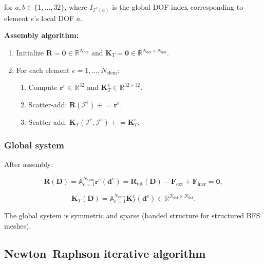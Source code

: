 \documentclass[11pt]{article}
\begin{document}
for $a,b\in\{1,\ldots,32\}$, where $I_{\mathcal{I}^{e}(a)}$ is the
global DOF index corresponding to element $e$'s local DOF $a$.

\textbf{Assembly algorithm:}
\begin{enumerate}
\item Initialize $\mathbf{R}=\mathbf{0}\in\mathbb{R}^{N_{\mathrm{dof}}}$
  and $\mathbf{K}_{T}=\mathbf{0}\in\mathbb{R}^{N_{\mathrm{dof}}\times N_{\mathrm{dof}}}$.
\item For each element $e=1,\ldots,N_{\mathrm{elem}}$:
  \begin{enumerate}
  \item Compute $\mathbf{r}^{e}\in\mathbb{R}^{32}$ and
    $\mathbf{K}_{T}^{e}\in\mathbb{R}^{32\times 32}$.
  \item Scatter-add: $\mathbf{R}(\mathcal{I}^{e}) \mathrel{+}= \mathbf{r}^{e}$.
  \item Scatter-add: $\mathbf{K}_{T}(\mathcal{I}^{e},\mathcal{I}^{e})
    \mathrel{+}= \mathbf{K}_{T}^{e}$.
  \end{enumerate}
\end{enumerate}

\subsubsection{Global system}

After assembly:

\begin{equation}
\boxed{
\mathbf{R}(\mathbf{D})
= \mathbb{A}_{e=1}^{N_{\mathrm{elem}}}
  \mathbf{r}^{e}(\mathbf{d}^{e})
= \mathbf{R}_{\mathrm{int}}(\mathbf{D})
- \mathbf{F}_{\mathrm{ext}}
+ \mathbf{F}_{\mathrm{iner}}
= \mathbf{0},
}
\label{s7:global_residual}
\end{equation}

\begin{equation}
\boxed{
\mathbf{K}_{T}(\mathbf{D})
= \mathbb{A}_{e=1}^{N_{\mathrm{elem}}}
  \mathbf{K}_{T}^{e}(\mathbf{d}^{e})
\in \mathbb{R}^{N_{\mathrm{dof}}\times N_{\mathrm{dof}}}.
}
\label{s7:global_tangent}
\end{equation}

The global system is symmetric and sparse (banded structure for
structured BFS meshes).

\subsection{Newton--Raphson iterative algorithm}
\label{ssec:newton}
\end{document}
